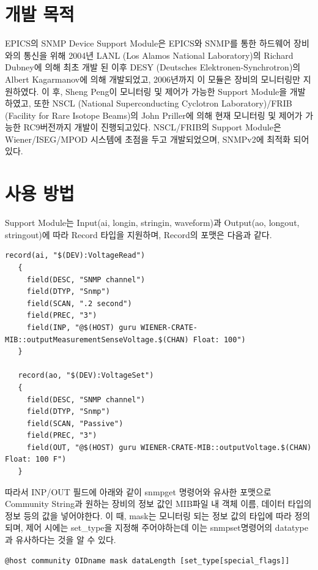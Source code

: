 \documentclass[11pt
  , a4paper
  , article
  , oneside
]{memoir}
\begin{document}
\section{개발 목적}
EPICS의 SNMP Device Support Module은 EPICS와 SNMP를 통한 하드웨어 장비와의 통신을 위해 2004년 LANL (Los Alamos National Laboratory)의 Richard Dubney에 의해 최초 개발 된 이후 DESY (Deutsches Elektronen-Synchrotron)의 Albert Kagarmanov에 의해 개발되었고, 2006년까지 이 모듈은 장비의 모니터링만 지원하였다. 이 후, Sheng Peng이 모니터링 및 제어가 가능한 Support Module을 개발하였고, 또한 NSCL (National Superconducting Cyclotron Laboratory)/FRIB (Facility for Rare Isotope Beams)의 John Priller에 의해 현재 모니터링 및 제어가 가능한 RC9버전까지 개발이 진행되고있다. NSCL/FRIB의 Support Module은 Wiener/ISEG/MPOD 시스템에 초점을 두고 개발되었으며, SNMPv2에 최적화 되어있다. 

\section{사용 방법}
Support Module는 Input(ai, longin, stringin, waveform)과 Output(ao, longout, stringout)에 따라 Record 타입을 지원하며, Record의 포맷은 다음과 같다\citep{devsnmp}. 

\begin{lstlisting}[style=termstyle]
   record(ai, "$(DEV):VoltageRead")
   {
     field(DESC, "SNMP channel")
     field(DTYP, "Snmp")
     field(SCAN, ".2 second")
     field(PREC, "3")
     field(INP, "@$(HOST) guru WIENER-CRATE-MIB::outputMeasurementSenseVoltage.$(CHAN) Float: 100")
   }

   record(ao, "$(DEV):VoltageSet")
   {
     field(DESC, "SNMP channel")
     field(DTYP, "Snmp")
     field(SCAN, "Passive")
     field(PREC, "3")
     field(OUT, "@$(HOST) guru WIENER-CRATE-MIB::outputVoltage.$(CHAN) Float: 100 F")
   }
\end{lstlisting}

따라서 INP/OUT 필드에 아래와 같이 snmpget 명령어와 유사한 포맷으로 Community String과 원하는 장비의 정보 값인 MIB파일 내 객체 이름, 데이터 타입의 정보 등의 값을 넣어야한다. 이 때, mask는 모니터링 되는 정보 값의 타입에 따라 정의되며, 제어 시에는 set\_type을 지정해 주어야하는데 이는 snmpset명령어의 datatype과 유사하다는 것을 알 수 있다.

\begin{lstlisting}[style=termstyle]
@host community OIDname mask dataLength [set_type[special_flags]]
\end{lstlisting}
\end{document}

